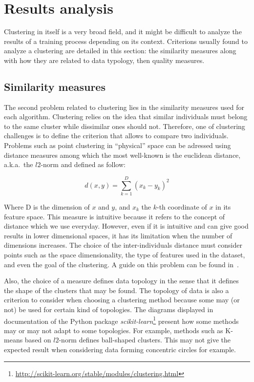     \section{Results analysis}
    Clustering in itself is a very broad field, and it might be difficult to analyze the results of a training process depending on its context. Criterions usually found to analyze a clustering are detailed in this section: the similarity measures along with how they are related to data typology, then quality measures.
    
    \subsection{Similarity measures}
    The second problem related to clustering lies in the similarity measures used for each algorithm. Clustering relies on the idea that similar individuals must belong to the same cluster while dissimilar ones should not. Therefore, one of clustering challenges is to define the criterion that allows to compare two individuals. Problems such as point clustering in ``physical'' space can be adressed using distance measures among which the most well-known is the euclidean distance, a.k.a.\ the $l2$-norm and defined as follow: 
    
    \begin{equation}
    d\left(x,y\right) = \sum_{k=1}^D {\left(x_k - y_k\right)}^2
    \end{equation}

    Where D is the dimension of $x$ and $y$, and $x_k$ the $k$-th coordinate of $x$ in its feature space. This measure is intuitive because it refers to the concept of distance which we use everyday. However, even if it is intuitive and can give good results in lower dimensional spaces, it has its limitation when the number of dimensions increases. The choice of the inter-individuals distance must consider points such as the space dimensionality, the type of features used in the dataset, and even the goal of the clustering. A guide on this problem can be found in~\cite{domingos2012few}.

    Also, the choice of a measure defines data topology in the sense that it defines the shape of the clusters that may be found. The topology of data is also a criterion to consider when choosing a clustering method because some may (or not) be used for certain kind of topologies. The diagrams displayed in documentation of the Python package \textit{scikit-learn}\footnote{\url{http://scikit-learn.org/stable/modules/clustering.html}} present how some methods may or may not adapt to some topologies. For example, methods such as K-means based on $l2$-norm defines ball-shaped clusters. This may not give the expected result when considering data forming concentric circles for example.

